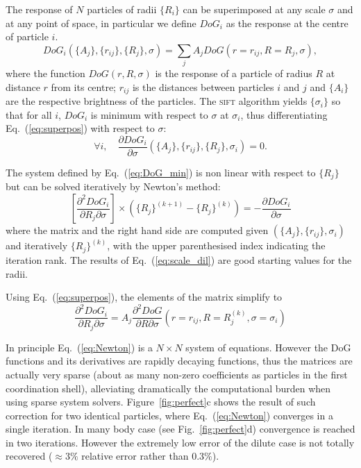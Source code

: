 \documentclass[8.5pt,twoside,twocolumn]{article}
\begin{document}
The response of $N$ particles of radii $\lbrace R_i\rbrace$ can be superimposed at any scale $\sigma$ and at any point of space, in particular we define $DoG_i$ as the response at the centre of particle $i$.
\begin{equation}
DoG_i(\lbrace A_j\rbrace, \lbrace r_{ij}\rbrace, \lbrace R_j\rbrace, \sigma) = \sum_j A_j DoG(r=r_{ij}, R=R_j, \sigma),
\label{eq:superpos}
\end{equation}
where the function $DoG(r,R,\sigma)$ is the response of a particle of radius $R$ at distance $r$ from its centre; $r_{ij}$ is the distances between particles $i$ and $j$ and $\lbrace A_i\rbrace$ are the respective brightness of the particles. The \textsc{sift} algorithm yields $\lbrace \sigma_i\rbrace$ so that for all $i$, $DoG_i$ is minimum with respect to $\sigma$ at $\sigma_i$, thus differentiating Eq.~(\ref{eq:superpos}) with respect to $\sigma$:
\begin{equation}
\forall i,\quad \frac{\partial DoG_i}{\partial\sigma}(\lbrace A_j\rbrace, \lbrace r_{ij}\rbrace, \lbrace R_j\rbrace, \sigma_i) = 0.
\label{eq:DoG_min}
\end{equation}

The system defined by Eq.~(\ref{eq:DoG_min}) is non linear with respect to $\lbrace R_j\rbrace$ but can be solved iteratively by Newton's method:
\begin{equation}
\left[ \frac{\partial^2 DoG_i}{\partial R_j\partial\sigma}\right] \times \left( \lbrace R_j\rbrace^{(k+1)} - \lbrace R_j\rbrace^{(k)} \right) = -\frac{\partial DoG_i}{\partial\sigma}
\label{eq:Newton}
\end{equation}
where the matrix and the right hand side are computed given $(\lbrace A_j\rbrace, \lbrace r_{ij}\rbrace, \sigma_i)$ and iteratively $\lbrace R_j\rbrace^{(k)}$, with the upper parenthesised index indicating the iteration rank. The results of Eq.~(\ref{eq:scale_dil}) are good starting values for the radii.

Using Eq.~(\ref{eq:superpos}), the elements of the matrix simplify to
\begin{equation}
\frac{\partial^2 DoG_i}{\partial R_j\partial\sigma} =  A_j \frac{\partial^2 DoG}{\partial R\partial\sigma}(r=r_{ij}, R=R_j^{(k)}, \sigma=\sigma_i)
\end{equation}

In principle Eq.~(\ref{eq:Newton}) is a $N\times N$ system of equations. However the DoG functions and its derivatives are rapidly decaying functions, thus the matrices are actually very sparse (about as many non-zero coefficients as particles in the first coordination shell), alleviating dramatically the computational burden when using sparse system solvers. Figure~\ref{fig:perfect}c shows the result of such correction for two identical particles, where Eq.~(\ref{eq:Newton}) converges in a single iteration. In many body case (see Fig.~\ref{fig:perfect}d) convergence is reached in two iterations. However the extremely low error of the dilute case is not totally recovered ($\approx 3\%$ relative error rather than $0.3\%$).
\end{document}
